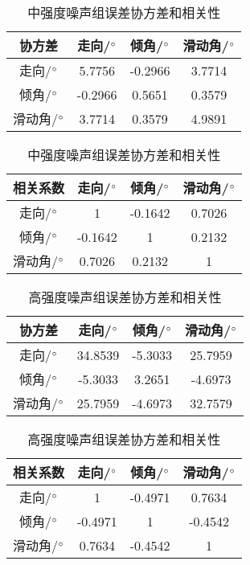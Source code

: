 \begin{table}[ht]
\centering
\caption{中强度噪声组误差协方差和相关性}
\label{tab3_03}
    \begin{tabular}{c c c c}
    \hline
    协方差 & 走向/$^\circ$ & 倾角/$^\circ$ & 滑动角/$^\circ$ \\
    \hline
	走向/$^\circ$ 		&5.7756 	&-0.2966	&3.7714\\
	倾角/$^\circ$		&-0.2966	&0.5651		&0.3579\\
	滑动角/$^\circ$	&3.7714		&0.3579		&4.9891\\
    \hline
    \end{tabular}
    \begin{tabular}{c c c c}
    \hline
    相关系数 & 走向/$^\circ$ & 倾角/$^\circ$ & 滑动角/$^\circ$ \\
    \hline
	走向/$^\circ$ 		&1 			&-0.1642	&0.7026\\
	倾角/$^\circ$		&-0.1642	&1			&0.2132\\
	滑动角/$^\circ$	&0.7026		&0.2132		&1\\
    \hline
    \end{tabular}
\end{table}

\begin{table}[ht]
\centering
\caption{高强度噪声组误差协方差和相关性}
\label{tab3_04}
    \begin{tabular}{c c c c}
    \hline
    协方差 & 走向/$^\circ$ & 倾角/$^\circ$ & 滑动角/$^\circ$ \\
    \hline
	走向/$^\circ$ 		&34.8539 	&-5.3033	&25.7959\\
	倾角/$^\circ$		&-5.3033	&3.2651		&-4.6973\\
	滑动角/$^\circ$	&25.7959	&-4.6973	&32.7579\\
    \hline
    \end{tabular}
    \begin{tabular}{c c c c}
    \hline
    相关系数 & 走向/$^\circ$ & 倾角/$^\circ$ & 滑动角/$^\circ$ \\
    \hline
	走向/$^\circ$ 		&1 			&-0.4971	&0.7634\\
	倾角/$^\circ$		&-0.4971	&1			&-0.4542\\
	滑动角/$^\circ$	&0.7634		&-0.4542		&1\\
    \hline
    \end{tabular}
\end{table}


